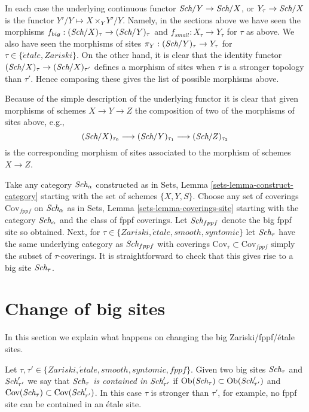 In each case the underlying continuous functor
$\textit{Sch}/Y \to \textit{Sch}/X$, or
$Y_\tau \to \textit{Sch}/X$
is the functor $Y'/Y \mapsto X \times_Y Y'/Y$. Namely, in the sections
above we have seen the morphisms
$f_{big} : (\textit{Sch}/X)_\tau \to (\textit{Sch}/Y)_\tau$
and
$f_{small} : X_\tau \to Y_\tau$
for $\tau$ as above.
We also have seen the morphisms of sites
$\pi_Y : (\textit{Sch}/Y)_\tau \to Y_\tau$ for
$\tau \in \{\acute{e}tale, Zariski\}$.
On the other hand, it is clear that the identity functor
$(\textit{Sch}/X)_\tau \to (\textit{Sch}/X)_{\tau'}$ defines
a morphism of sites when $\tau$ is a stronger topology than
$\tau'$. Hence composing these gives the list of possible morphisms
above.

\medskip\noindent
Because of the simple description of the underlying functor it
is clear that given morphisms of schemes $X \to Y \to Z$ the
composition of two of the morphisms of sites above, e.g.,
$$
(\textit{Sch}/X)_{\tau_0} \longrightarrow
(\textit{Sch}/Y)_{\tau_1} \longrightarrow
(\textit{Sch}/Z)_{\tau_2}
$$
is the corresponding morphism of sites associated to the morphism
of schemes $X \to Z$.

\begin{remark}
\label{remark-choice-sites}
Take any category $\textit{Sch}_\alpha$ constructed as in
Sets, Lemma \ref{sets-lemma-construct-category}
starting with the set of schemes $\{X, Y, S\}$. Choose any set of
coverings $\text{Cov}_{fppf}$ on $\textit{Sch}_\alpha$ as in
Sets, Lemma \ref{sets-lemma-coverings-site}
starting with the category $\textit{Sch}_\alpha$ and the class of fppf
coverings. Let $\textit{Sch}_{fppf}$ denote the big fppf site so
obtained. Next, for $\tau \in \{Zariski, \acute{e}tale, smooth, syntomic\}$
let $\textit{Sch}_\tau$ have the same underlying category as
$\textit{Sch}_{fppf}$ with coverings
$\text{Cov}_\tau \subset \text{Cov}_{fppf}$ simply the subset of
$\tau$-coverings. It is straightforward to check that this gives rise
to a big site $\textit{Sch}_\tau$.
\end{remark}









\section{Change of big sites}
\label{section-change-alpha}

\noindent
In this section we explain what happens on changing the big
Zariski/fppf/\'etale sites.

\medskip\noindent
Let $\tau, \tau' \in \{Zariski, \acute{e}tale, smooth, syntomic, fppf\}$.
Given two big sites $\textit{Sch}_\tau$ and $\textit{Sch}'_{\tau'}$
we say that
{\it $\textit{Sch}_\tau$ is contained in $\textit{Sch}'_{\tau'}$} if
$\mathop{\rm Ob}\nolimits(\textit{Sch}_\tau) \subset \mathop{\rm Ob}\nolimits(\textit{Sch}'_{\tau'})$
and
$\text{Cov}(\textit{Sch}_\tau) \subset \text{Cov}(\textit{Sch}'_{\tau'})$.
In this case $\tau$ is stronger than $\tau'$, for example, no fppf
site can be contained in an \'etale site.

